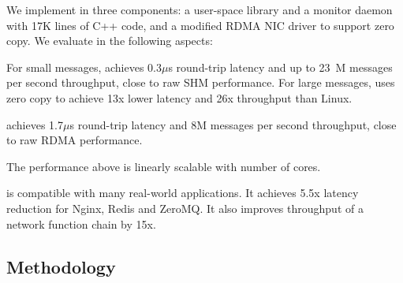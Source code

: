 
We implement \sys in three components: a user-space library \libipc{} and a monitor daemon with 17K lines of C++ code, and a modified RDMA NIC driver to support zero copy. We evaluate \sys in the following aspects:

For small messages, \sys achieves 0.3$\mu$s round-trip latency and up to 23~M messages per second throughput, close to raw SHM performance. For large messages, \sys uses zero copy to achieve 13x lower latency and 26x throughput than Linux.

\sys achieves  1.7$\mu$s round-trip latency and 8M messages per second throughput, close to raw RDMA performance.


The performance above is linearly scalable with number of cores. %


\sys{} is compatible with many real-world applications.
It achieves 5.5x latency reduction for Nginx, Redis and ZeroMQ.
It also improves throughput of a network function chain by 15x.


\subsection{Methodology}
\label{subsec:methodology}

